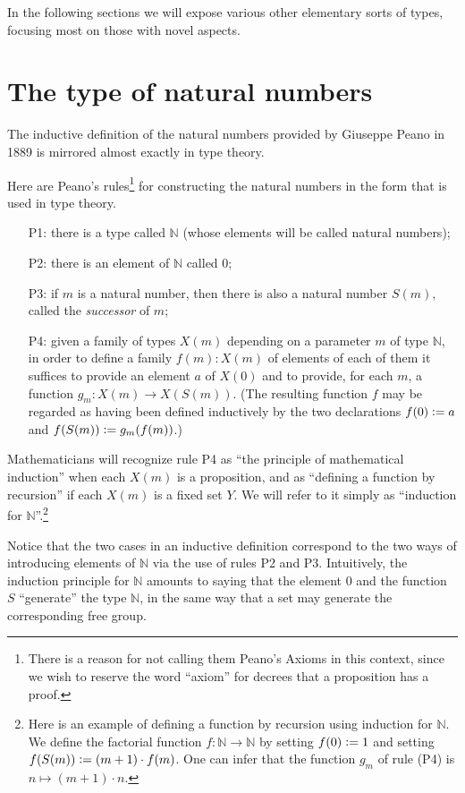 \documentclass[letter,12pt]{amsart}
\theoremstyle{definition}
\theoremstyle{remark}
\numberwithin{equation}{section}
\newcommand{\NN}{\mathbb{N}}
\newcommand{\defeq}{\vcentcolon=}
\begin{document}
In the following sections we will expose various other elementary sorts of types, focusing most on those with novel aspects.

\section{The type of natural numbers}\label{nat}

The inductive definition of the natural numbers provided by Giuseppe Peano in 1889 \citep{peano-principia} is mirrored almost exactly in type
theory.

Here are Peano's rules\footnote{There is a reason for not calling them Peano's Axioms in this context, since we wish to reserve the word ``axiom''
  for decrees that a proposition has a proof.} for constructing the natural numbers in the form that is used in type theory.
\begin{enumerate}
\item[P1:] there is a type called $\NN$ (whose elements will be called natural numbers);
\item[P2:] there is an element of $\NN$ called $0$;
\item[P3:] if $m$ is a natural number, then there is also a natural number $S(m)$, called the {\em successor} of $m$;
\item[P4:] given a family of types $X(m)$ depending on a parameter
  $m$ of type $\NN$, in order to define a family $f(m) : X(m)$ of elements of each of them it suffices to provide an element $a$ of $X(0)$ and
  to provide, for each $m$, a function $g_m : X(m) \to X(S(m))$.  (The resulting function $f$ may be regarded as having been defined inductively
  by the two declarations $f(0) \defeq a$ and $f(S(m)) \defeq g_m(f(m))$.)
\end{enumerate}
\nopagebreak
Mathematicians will recognize rule P4 as ``the principle of mathematical induction'' when each $X(m)$ is a proposition, and as ``defining a
function by recursion'' if each $X(m)$ is a fixed set $Y$.  We will refer to it simply as ``induction for $\NN$''.\footnote{Here is an example
  of defining a function by recursion using induction for $\NN$.  We define the factorial function $f : \NN \to \NN$ by setting $f(0) \defeq 1$
  and setting $f(S(m)) \defeq (m+1) \cdot f(m)$.  One can infer that the function $g_m$ of rule (P4) is $n \mapsto (m+1) \cdot n$.}

Notice that
the two cases in an inductive definition correspond to the two ways of introducing elements of $\NN$ via the use of rules P2 and P3.
Intuitively, the induction principle for $\NN$ amounts to saying that the element $0$ and the function $S$ ``generate'' the type $\NN$, in the
same way that a set may generate the corresponding free group.
\end{document}
